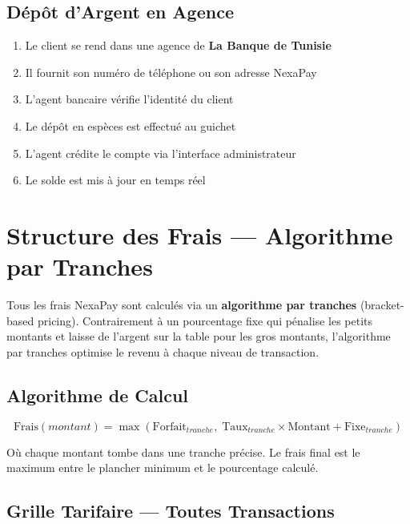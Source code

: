 \documentclass[11pt,a4paper]{article}
\begin{document}
\subsection{D\'ep\^ot d'Argent en Agence}

\begin{enumerate}[leftmargin=*]
    \item Le client se rend dans une agence de \textbf{La Banque de Tunisie}
    \item Il fournit son num\'ero de t\'el\'ephone ou son adresse NexaPay
    \item L'agent bancaire v\'erifie l'identit\'e du client
    \item Le d\'ep\^ot en esp\`eces est effectu\'e au guichet
    \item L'agent cr\'edite le compte via l'interface administrateur
    \item Le solde est mis \`a jour en temps r\'eel
\end{enumerate}

\newpage

\section{Structure des Frais --- Algorithme par Tranches}

Tous les frais NexaPay sont calcul\'es via un \textbf{algorithme par tranches} (bracket-based pricing). Contrairement \`a un pourcentage fixe qui p\'enalise les petits montants et laisse de l'argent sur la table pour les gros montants, l'algorithme par tranches optimise le revenu \`a chaque niveau de transaction.

\subsection{Algorithme de Calcul}

\[
\text{Frais}(montant) = \max\left(\text{Forfait}_{tranche},\; \text{Taux}_{tranche} \times \text{Montant} + \text{Fixe}_{tranche}\right)
\]

O\`u chaque montant tombe dans une tranche pr\'ecise. Le frais final est le maximum entre le plancher minimum et le pourcentage calcul\'e.

\subsection{Grille Tarifaire --- Toutes Transactions}
\end{document}
